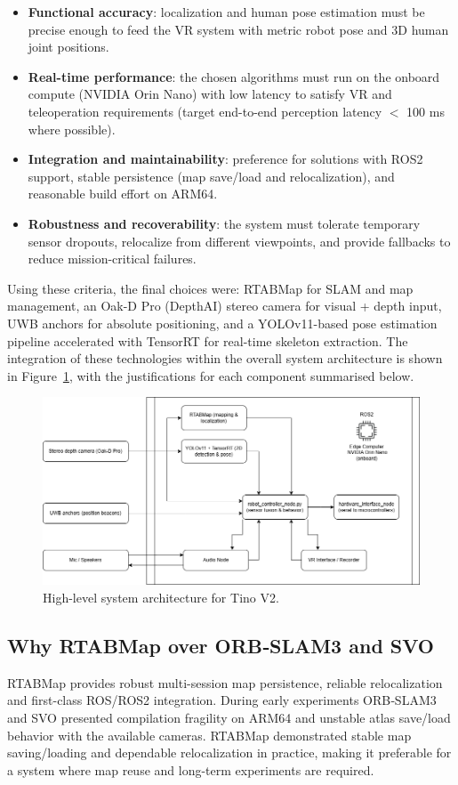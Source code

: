 \begin{itemize}
	\item \textbf{Functional accuracy}: localization and human pose estimation must be precise enough to feed the VR system with metric robot pose and 3D human joint positions.
	\item \textbf{Real-time performance}: the chosen algorithms must run on the onboard compute (NVIDIA Orin Nano) with low latency to satisfy VR and teleoperation requirements (target end-to-end perception latency $<$ 100 ms where possible).
	\item \textbf{Integration and maintainability}: preference for solutions with ROS2 support, stable persistence (map save/load and relocalization), and reasonable build effort on ARM64.
	\item \textbf{Robustness and recoverability}: the system must tolerate temporary sensor dropouts, relocalize from different viewpoints, and provide fallbacks to reduce mission-critical failures.
\end{itemize}

Using these criteria, the final choices were: RTABMap for SLAM and map management, an Oak-D Pro (DepthAI) stereo camera for visual + depth input, UWB anchors for absolute positioning, and a YOLOv11-based pose estimation pipeline accelerated with TensorRT for real-time skeleton extraction. The integration of these technologies within the overall system architecture is shown in Figure~\ref{fig-system-architecture}, with the justifications for each component summarised below.

\begin{figure}[H]
	\centering
	\includegraphics[width=0.85\linewidth]{Images/system_architecture.png}
	\caption{High-level system architecture for Tino V2.}\label{fig-system-architecture}
\end{figure}

\subsection*{Why RTABMap over ORB‑SLAM3 and SVO}
RTABMap provides robust multi-session map persistence, reliable relocalization and first-class ROS/ROS2 integration. During early experiments ORB‑SLAM3 and SVO presented compilation fragility on ARM64 and unstable atlas save/load behavior with the available cameras. RTABMap demonstrated stable map saving/loading and dependable relocalization in practice, making it preferable for a system where map reuse and long-term experiments are required.

